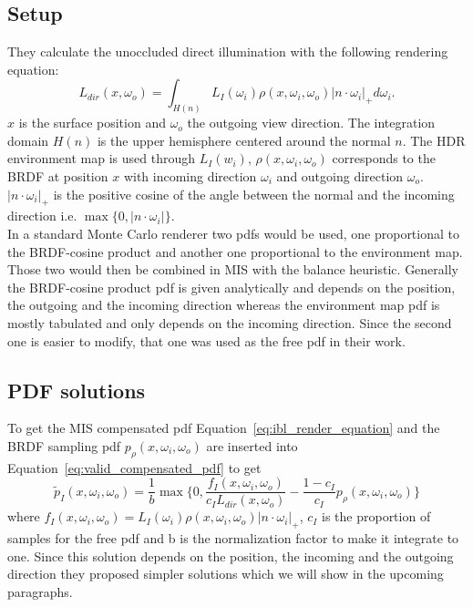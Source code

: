 \subsection{Setup}
\label{sec:ibl_setup}
They calculate the unoccluded direct illumination with the following rendering equation:
\begin{equation}
    \label{eq:ibl_render_equation}
    L_{dir}(x, \omega_o) = \int_{H(n)} L_I(\omega_i) \rho(x, \omega_i, \omega_o) |n \cdot \omega_i|_+ d\omega_i.
\end{equation}
$ x $ is the surface position and $ \omega_o $ the outgoing view direction.
The integration domain $ H(n) $ is the upper hemisphere centered around the normal $ n $.
The HDR environment map is used through $ L_I(w_i) $,
$ \rho(x, \omega_i, \omega_o) $ corresponds to the BRDF at position $ x $
with incoming direction $ \omega_i $ and outgoing direction $ \omega_o $.
$ |n \cdot \omega_i|_+ $ is the positive cosine of the angle between the normal and the incoming direction i.e. $ \max\{0, |n \cdot \omega_i|\} $.\\
In a standard Monte Carlo renderer two pdfs would be used,
one proportional to the BRDF-cosine product and another one proportional to the environment map.
Those two would then be combined in MIS with the balance heuristic.
Generally the BRDF-cosine product pdf is given analytically and depends on the position, the outgoing and the incoming direction
whereas the environment map pdf is mostly tabulated and only depends on the incoming direction.
Since the second one is easier to modify,
that one was used as the free pdf in their work.


\subsection{PDF solutions}
\label{sec:ibl_pdfs}
To get the MIS compensated pdf Equation~\ref{eq:ibl_render_equation}
and the BRDF sampling pdf $ p_{\rho}(x, \omega_i, \omega_o) $ are inserted into Equation~\ref{eq:valid_compensated_pdf}
to get $$ \tilde{p}_I(x, \omega_i, \omega_o) = \frac{1}{b} \max\{0, \frac{f_I(x, \omega_i, \omega_o)}{c_I L_{dir}(x, \omega_o)} - \frac{1 - c_I}{c_I} p_\rho(x, \omega_i, \omega_o)\} $$
where $ f_I(x, \omega_i, \omega_o) = L_I(\omega_i) \rho(x, \omega_i, \omega_o) |n \cdot \omega_i|_+ $,
$ c_I $ is the proportion of samples for the free pdf and b is the normalization factor to make it integrate to one.
Since this solution depends on the position, the incoming and the outgoing direction
they proposed simpler solutions which we will show in the upcoming paragraphs.


